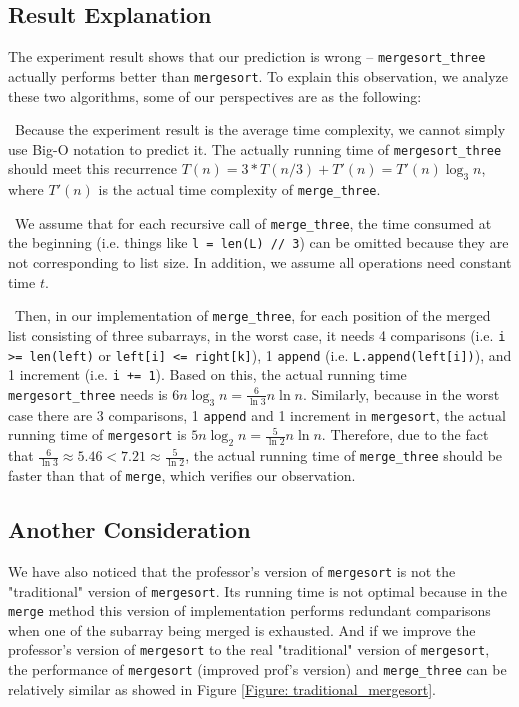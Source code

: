 \documentclass[12pt]{article}
\begin{document}
\subsection{Result Explanation}
The experiment result shows that our prediction is wrong \--- \verb|mergesort_three| actually performs better than \verb|mergesort|. To explain this observation, we analyze these two algorithms, some of our perspectives are as the following:

~\newline\noindent Because the experiment result is the average time complexity, we cannot simply use Big-O notation to predict it. The actually running time of \verb|mergesort_three| should meet this recurrence $T(n) = 3 * T(n/3) + T'(n) = T'(n) \log_3 n$, where $ T'(n)$ is the actual time complexity of \verb|merge_three|. 

~\newline\noindent We assume that for each recursive call of \verb|merge_three|, the time consumed at the beginning (i.e. things like \verb|l = len(L) // 3|) can be omitted because they are not corresponding to list size. In addition, we assume all operations need constant time $t$.

~\newline\noindent Then, in our implementation of \verb|merge_three|, for each position of the merged list consisting of three subarrays, in the worst case, it needs 4 comparisons (i.e. \verb|i >= len(left)| or \verb|left[i] <= right[k]|), 1 \verb|append| (i.e. \verb|L.append(left[i])|), and 1 increment (i.e. \verb|i += 1|).  Based on this, the actual running time \verb|mergesort_three| needs is $6n \log_3 n = \frac{6}{\ln 3} n \ln n$. Similarly, because in the worst case there are 3 comparisons, 1 \verb|append| and 1  increment in \verb|mergesort|, the actual running time of \verb|mergesort| is $5n \log_2 n = \frac{5}{\ln 2} n \ln n$. Therefore, due to the fact that $\frac{6}{\ln 3} \approx 5.46 < 7.21 \approx \frac{5}{\ln 2}$, the actual running time of \verb|merge_three| should be faster than that of \verb|merge|, which verifies our observation.

\subsection{Another Consideration}
We have also noticed that the professor's version of \verb|mergesort| is not the "traditional" version of \verb|mergesort|. Its running time is not optimal because in the \verb|merge| method this version of implementation performs redundant comparisons when one of the subarray being merged is exhausted. And if we improve the professor's version of \verb|mergesort| to the real "traditional" version of \verb|mergesort|, the performance of \verb|mergesort| (improved prof's version) and \verb|merge_three| can be relatively similar as showed in Figure \ref{Figure: traditional_mergesort}.
\end{document}
